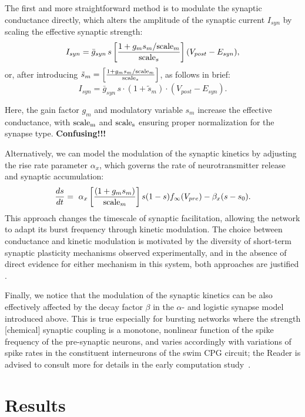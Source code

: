 \documentclass[nofootinbib,aip,amsmath,amssymb,reprint,twocolumn,10pt]{revtex4-2}
\begin{document}
 The first and more straightforward method is to modulate the synaptic conductance directly, which alters the amplitude of the synaptic current $I_{syn}$ by scaling the effective synaptic strength:
\begin{equation}
I_{syn} = {\bar g}_{syn}\,s \left [ \frac{ 1+g_m s_m/{\rm scale}_m}{{\rm scale}_s} \right ] (V_{post}-E_{syn}),
\end{equation}
or, after introducing $\tilde s_m=\left [ \frac{ 1+g_m s_m/{\rm scale}_m}{{\rm scale}_s} \right ]$,  as follows in brief:
\begin{equation}
I_{syn} = {\bar g}_{syn}\,s \cdot \left (1+{\tilde s_m} \right ) \cdot  (V_{post}-E_{syn}).
\end{equation}

Here, the gain factor $g_m$ and modulatory variable $s_m$ increase the effective conductance, with $\rm scale_m$ and $\rm scale_s$ ensuring proper normalization for the synapse type.  {\bf Confusing!!! }

Alternatively, we can model the modulation of the synaptic kinetics by adjusting the rise rate parameter $\alpha_x$, which governs the rate of neurotransmitter release and synaptic accumulation:
\begin{equation}
\frac{ds}{dt} = \ \alpha_x \left [ \frac{(1 + g_m s_m)}{{\rm scale}_m} \right ]  s (1 - s) f_{\infty}(V_{pre}) - \beta_x (s - s_0).
\end{equation}
This approach changes the timescale of synaptic facilitation, allowing the network to adapt its burst frequency through kinetic modulation. The choice between conductance and kinetic modulation is motivated by the diversity of short-term synaptic plasticity mechanisms observed experimentally, and in the absence of direct evidence for either mechanism in this system, both approaches are justified \cite{zucker2002short, jackman2017mechanisms}. 

Finally, we notice that the modulation of the synaptic kinetics can be also effectively affected by the decay factor $\beta$ in the $\alpha$- and logistic synapse model introduced above.  This is true especially for bursting networks where the strength  [chemical] synaptic coupling is a monotone, nonlinear function of the spike frequency of the pre-synaptic neurons, and varies accordingly with variations of spike rates in the constituent interneurons of the swim CPG circuit; the Reader is advised to consult more for details in the early computation study~\cite{scully2024pairing}.   

\section{Results}
\end{document}
